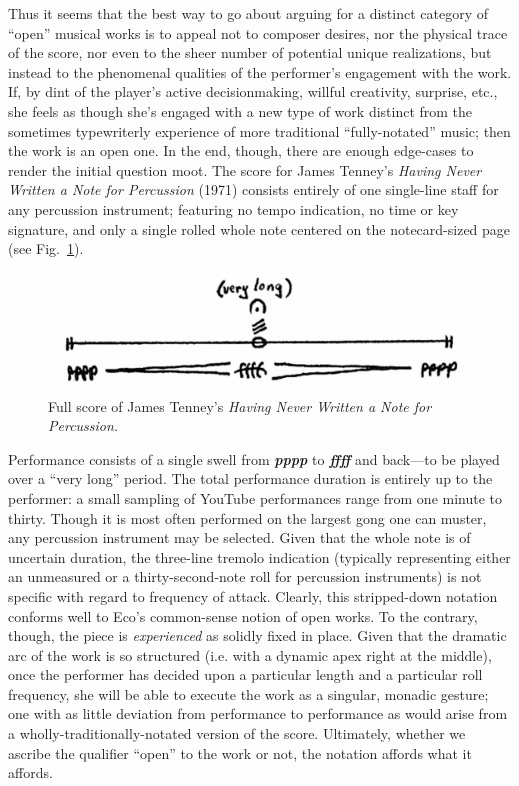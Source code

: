     Thus it seems that the best way to go about arguing for a distinct category of ``open'' musical works is to appeal not to composer desires, nor the physical trace of the score, nor even to the sheer number of potential unique realizations, but instead to the phenomenal qualities of the performer's engagement with the work. If, by dint of the player's active decisionmaking, willful creativity, surprise, etc., she feels as though she's engaged with a new type of work distinct from the sometimes typewriterly experience of more traditional ``fully-notated'' music; then the work is an open one. In the end, though, there are enough edge-cases to render the initial question moot. The score for James Tenney's \textit{Having Never Written a Note for Percussion} (1971) consists entirely of one single-line staff for any percussion instrument; featuring no tempo indication, no time or key signature, and only a single rolled whole note centered on the notecard-sized page (see Fig.~\ref{fig:tenney}). 

            \begin{figure} 
            \centering
            \includegraphics[width=.8\textwidth]{images/chapter2/tenney.png}
            \captionsetup{width=.5\textwidth}
            \caption[Full score of James Tenney's \textit{Having Never Written a Note for Percussion.}]{Full score of James Tenney's \textit{Having Never Written a Note for Percussion.}\footnotemark}
            \label{fig:tenney}
        \end{figure}

    Performance consists of a single swell from \textbf{\textit{pppp}} to \textbf{\textit{ffff}} and back---to be played over a ``very long'' period. The total performance duration is entirely up to the performer: a small sampling of YouTube performances range from one minute to thirty. Though it is most often performed on the largest gong one can muster, any percussion instrument may be selected. Given that the whole note is of uncertain duration, the three-line tremolo indication (typically representing either an unmeasured or a thirty-second-note roll for percussion instruments) is not specific with regard to frequency of attack. Clearly, this stripped-down notation conforms well to Eco's common-sense notion of open works. To the contrary, though, the piece is \textit{experienced} as solidly fixed in place. Given that the dramatic arc of the work is so structured (i.e. with a dynamic apex right at the middle), once the performer has decided upon a particular length and a particular roll frequency, she will be able to execute the work as a singular, monadic gesture; one with as little deviation from performance to performance as would arise from a wholly-traditionally-notated version of the score. Ultimately, whether we ascribe the qualifier ``open'' to the work or not, the notation affords what it affords.

